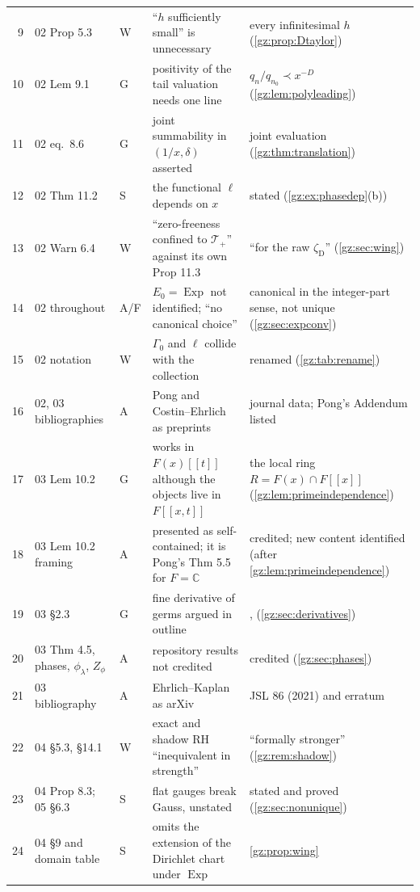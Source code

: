 \documentclass[11pt,a4paper]{article}
\numberwithin{equation}{section}
\theoremstyle{definition}
\theoremstyle{remark}
\newcommand{\C}{\mathbb C}
\newcommand{\Exp}{\operatorname{Exp}}
\newcommand{\zD}{\zeta_{\mathrm D}}
\newcommand{\Tp}{\mathcal T_{+}}
\begin{document}
\begin{center}
\begin{longtable}{@{}rP{0.16\textwidth}lP{0.30\textwidth}P{0.34\textwidth}@{}}
9 & 02 Prop 5.3 & W & ``$h$ sufficiently small'' is unnecessary & every infinitesimal $h$ (\cref{gz:prop:Dtaylor})\\
10 & 02 Lem 9.1 & G & positivity of the tail valuation needs one line & $q_n/q_{n_0}\prec x^{-D}$ (\cref{gz:lem:polyleading})\\
11 & 02 eq.\ 8.6 & G & joint summability in $(1/x,\delta)$ asserted & joint evaluation (\cref{gz:thm:translation})\\
12 & 02 Thm 11.2 & S & the functional $\ell$ depends on $x$ & stated (\cref{gz:ex:phasedep}(b))\\
13 & 02 Warn 6.4 & W & ``zero-freeness confined to $\Tp$'' against its own Prop 11.3 & ``for the raw $\zD$'' (\cref{gz:sec:wing})\\
14 & 02 throughout & A/F & $E_0=\Exp$ not identified; ``no canonical choice'' & canonical in the integer-part sense, not unique (\cref{gz:sec:expconv})\\
15 & 02 notation & W & $\Gamma_0$ and $\ell$ collide with the collection & renamed (\cref{gz:tab:rename})\\
16 & 02, 03 bibliographies & A & Pong and Costin--Ehrlich as preprints & journal data; Pong's Addendum listed\\
17 & 03 Lem 10.2 & G & works in $F(x)[[t]]$ although the objects live in $F[[x,t]]$ & the local ring $R=F(x)\cap F[[x]]$ (\cref{gz:lem:primeindependence})\\
18 & 03 Lem 10.2 framing & A & presented as self-contained; it is Pong's Thm 5.5 for $F=\C$ & credited; new content identified (after \cref{gz:lem:primeindependence})\\
19 & 03 \S2.3 & G & fine derivative of germs argued in outline & ,  (\cref{gz:sec:derivatives})\\
20 & 03 Thm 4.5, phases, $\phi_\lambda$, $Z_\phi$ & A & repository results not credited & credited (\cref{gz:sec:phases})\\
21 & 03 bibliography & A & Ehrlich--Kaplan as arXiv & JSL 86 (2021) and erratum\\
22 & 04 \S5.3, \S14.1 & W & exact and shadow RH ``inequivalent in strength'' & ``formally stronger'' (\cref{gz:rem:shadow})\\
23 & 04 Prop 8.3; 05 \S6.3 & S & flat gauges break Gauss, unstated & stated and proved (\cref{gz:sec:nonunique})\\
24 & 04 \S9 and domain table & S & omits the extension of the Dirichlet chart under $\Exp$ & \cref{gz:prop:wing}\\

\end{longtable}
\end{center}
\end{document}
